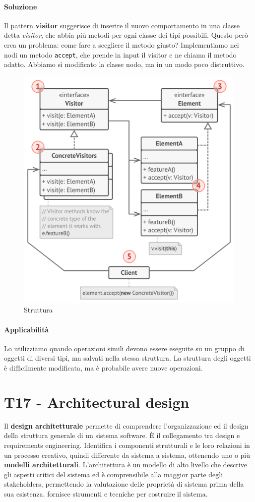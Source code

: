 \documentclass[11pt]{article}
\newcommand{\code}[1]{\texttt{#1}}
\begin{document}
\paragraph{Soluzione}
Il pattern \textbf{visitor} suggerisce di inserire il nuovo comportamento in una classe detta \textit{visitor}, che abbia più metodi per ogni classe dei tipi possibili. Questo però crea un problema: come fare a scegliere il metodo giusto? Implementiamo nei nodi un metodo \code{accept}, che prende in input il visitor e ne chiama il metodo adatto. Abbiamo sì modificato la classe nodo, ma in un modo poco distruttivo. 
\begin{figure}[H]
    \includegraphics[width=\linewidth]{res/teoria/Visitor.png}
    \caption{Struttura}
\end{figure}
\paragraph{Applicabilità}
Lo utilizziamo quando operazioni simili devono essere eseguite su un gruppo di oggetti di diversi tipi, ma salvati nella stessa struttura. La struttura degli oggetti è difficilmente modificata, ma è probabile avere nuove operazioni. 
\section{T17 - Architectural design}
Il \textbf{design architetturale} permette di comprendere l'organizzazione ed il design della struttura generale di un sistema software. È il collegamento tra design e requirements engineering. Identifica i componenti strutturali e le loro relazioni in un processo creativo, quindi differente da sistema a sistema, ottenendo uno o più \textbf{modelli architetturali}. L'architettura è un modello di alto livello che descrive gli aspetti critici del sistema ed è comprensibile alla maggior parte degli stakeholders, permettendo la valutazione delle proprietà di sistema prima della sua esistenza. fornisce strumenti e tecniche per costruire il sistema. 
\end{document}
